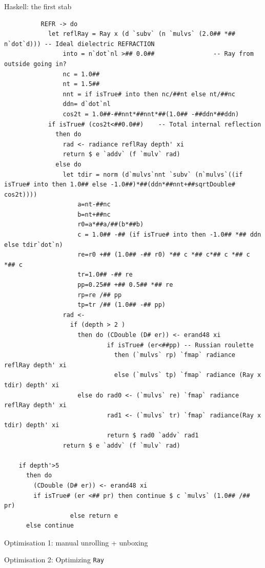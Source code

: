 \documentclass[8pt]{beamer}
\newcommand{\Ray}{\texttt{Ray}}
\begin{document}
\begin{frame}[fragile]{Haskell: the first stab}
{\begin{verbatim}
          REFR -> do
            let reflRay = Ray x (d `subv` (n `mulvs` (2.0## *## n`dot`d))) -- Ideal dielectric REFRACTION
                into = n`dot`nl >## 0.0##                -- Ray from outside going in?
                nc = 1.0##
                nt = 1.5##
                nnt = if isTrue# into then nc/##nt else nt/##nc
                ddn= d`dot`nl
                cos2t = 1.0##-##nnt*##nnt*##(1.0## -##ddn*##ddn)
            if isTrue# (cos2t<##0.0##)    -- Total internal reflection
              then do
                rad <- radiance reflRay depth' xi
                return $ e `addv` (f `mulv` rad)
              else do
                let tdir = norm (d`mulvs`nnt `subv` (n`mulvs`((if isTrue# into then 1.0## else -1.0##)*##(ddn*##nnt+##sqrtDouble# cos2t))))
                    a=nt-##nc
                    b=nt+##nc
                    r0=a*##a/##(b*##b)
                    c = 1.0## -## (if isTrue# into then -1.0## *## ddn else tdir`dot`n)
                    re=r0 +## (1.0## -## r0) *## c *## c*## c *## c *## c 
                    tr=1.0## -## re
                    pp=0.25## +## 0.5## *## re
                    rp=re /## pp
                    tp=tr /## (1.0## -## pp)
                rad <-
                  if (depth > 2 )
                    then do (CDouble (D# er)) <- erand48 xi
                            if isTrue# (er<##pp) -- Russian roulette
                              then (`mulvs` rp) `fmap` radiance reflRay depth' xi
                              else (`mulvs` tp) `fmap` radiance (Ray x tdir) depth' xi
                    else do rad0 <- (`mulvs` re) `fmap` radiance reflRay depth' xi
                            rad1 <- (`mulvs` tr) `fmap` radiance(Ray x tdir) depth' xi
                            return $ rad0 `addv` rad1
                return $ e `addv` (f `mulv` rad)

    if depth'>5
      then do
        (CDouble (D# er)) <- erand48 xi
        if isTrue# (er <## pr) then continue $ c `mulvs` (1.0## /## pr)
                  else return e
      else continue 
\end{verbatim}
}
\end{frame}


\begin{frame}[fragile]{Optimisation 1: manual unrolling + unboxing }
\end{frame}

\begin{frame}[fragile]{Optimisation 2: Optimizing \Ray}
\end{frame}
\end{document}
